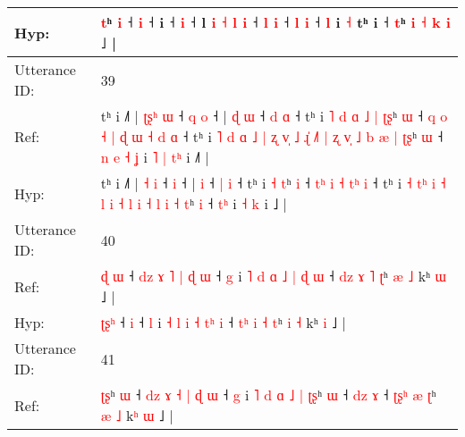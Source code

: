 \documentclass[10pt]{article}
\DeclareRobustCommand{\hl}[1]{{\textcolor{red}{#1}}}
\begin{document}
\begin{longtable}{ll}
 \\
Hyp: & \hl{}\hl{t}ʰ \hl{i} ˧\hl{}\hl{} \hl{i} ˧\hl{}\hl{} i\hl{}\hl{}\hl{}\hl{}\hl{}\hl{}\hl{}\hl{} ˧\hl{}\hl{} \hl{i} ˧\hl{}\hl{}\hl{}\hl{}\hl{}\hl{}\hl{}\hl{}\hl{}\hl{}\hl{}\hl{}\hl{}\hl{}\hl{}\hl{}\hl{} l\hl{}\hl{}\hl{}\hl{} \hl{i} \hl{}\hl{˧} \hl{l} \hl{}\hl{i} ˧\hl{}\hl{} \hl{}\hl{}\hl{l} \hl{i} ˧ \hl{l} \hl{i} ˧ \hl{l} i\hl{}\hl{} \hl{˧} tʰ i ˧ \hl{t}ʰ \hl{i} \hl{˧} \hl{}\hl{k} \hl{i} ˩ |
 \\
\midrule
Utterance ID: & 39 \\
Ref: & tʰ i ˩˥ | \hl{ʈ}\hl{ʂ}\hl{ʰ} \hl{ɯ} ˧\hl{ }\hl{q} \hl{o} ˧ |\hl{ }\hl{ɖ} \hl{ɯ} ˧ \hl{d} \hl{ɑ} ˧ tʰ i\hl{ }\hl{˥}\hl{ }\hl{d}\hl{ }\hl{ɑ}\hl{ }\hl{˩} \hl{|} \hl{ʈ}\hl{ʂ}ʰ \hl{ɯ} ˧\hl{ }\hl{q}\hl{ }\hl{o} \hl{˧}\hl{ }\hl{|} \hl{ɖ} \hl{ɯ} \hl{˧}\hl{ }\hl{d} \hl{ɑ} ˧ tʰ i\hl{ }\hl{˥}\hl{ }\hl{d}\hl{ }\hl{ɑ} \hl{˩} \hl{|}\hl{ }\hl{ʐ} \hl{v}\hl{̩} \hl{˩} \hl{ɻ}\hl{̍} \hl{˩}\hl{˥} \hl{|} \hl{ʐ} \hl{v}\hl{̩} \hl{˩} \hl{b} \hl{æ} \hl{|} \hl{ʈ}\hl{ʂ}ʰ \hl{ɯ} ˧\hl{ }\hl{n}\hl{ }\hl{e} \hl{˧}\hl{ }\hl{ʝ} i\hl{ }\hl{˥} \hl{|} \hl{t}\hl{ʰ} i ˩\hl{˥} |
 \\
Hyp: & tʰ i ˩˥ | \hl{}\hl{}\hl{˧} \hl{i} ˧\hl{}\hl{} \hl{i} ˧ |\hl{}\hl{} \hl{i} ˧ \hl{|} \hl{i} ˧ tʰ i\hl{}\hl{}\hl{}\hl{}\hl{}\hl{}\hl{}\hl{} \hl{˧} \hl{}\hl{t}ʰ \hl{i} ˧\hl{}\hl{}\hl{}\hl{} \hl{}\hl{t}\hl{ʰ} \hl{i} \hl{˧} \hl{}\hl{t}\hl{ʰ} \hl{i} ˧ tʰ i\hl{}\hl{}\hl{}\hl{}\hl{}\hl{} \hl{˧} \hl{}\hl{t}\hl{ʰ} \hl{}\hl{i} \hl{˧} \hl{}\hl{l} \hl{}\hl{i} \hl{˧} \hl{l} \hl{}\hl{i} \hl{˧} \hl{l} \hl{i} \hl{˧} \hl{}\hl{t}ʰ \hl{i} ˧\hl{}\hl{}\hl{}\hl{} \hl{}\hl{t}\hl{ʰ} i\hl{}\hl{} \hl{˧} \hl{}\hl{k} i ˩\hl{} |
 \\
\midrule
Utterance ID: & 40 \\
Ref: & \hl{ɖ}\hl{ }\hl{ɯ} ˧\hl{ }\hl{d}\hl{z}\hl{ }\hl{ɤ}\hl{ }\hl{˥}\hl{ }\hl{|}\hl{ }\hl{ɖ} \hl{ɯ} ˧ \hl{g} i \hl{˥} \hl{d} \hl{ɑ} \hl{˩} \hl{|}\hl{ }\hl{ɖ} \hl{ɯ} ˧ \hl{d}\hl{z} \hl{ɤ} \hl{˥} \hl{ʈ}ʰ \hl{æ} \hl{˩} kʰ \hl{ɯ} ˩ |
 \\
Hyp: & \hl{ʈ}\hl{ʂ}\hl{ʰ} ˧\hl{}\hl{}\hl{}\hl{}\hl{}\hl{}\hl{}\hl{}\hl{}\hl{}\hl{} \hl{i} ˧ \hl{l} i \hl{˧} \hl{l} \hl{i} \hl{˧} \hl{}\hl{t}\hl{ʰ} \hl{i} ˧ \hl{t}\hl{ʰ} \hl{i} \hl{˧} \hl{t}ʰ \hl{i} \hl{˧} kʰ \hl{i} ˩ |
 \\
\midrule
Utterance ID: & 41 \\
Ref: & \hl{ʈ}\hl{ʂ}ʰ \hl{ɯ} ˧ \hl{d}\hl{z} \hl{ɤ} \hl{˧} \hl{|} \hl{ɖ} \hl{ɯ} ˧ \hl{}\hl{g} i \hl{˥} \hl{d}\hl{ }\hl{ɑ} \hl{˩} \hl{|} \hl{ʈ}\hl{ʂ}ʰ \hl{ɯ} ˧ \hl{d}\hl{z} \hl{ɤ} ˧ \hl{}\hl{ʈ}\hl{ʂ}\hl{ʰ} \hl{æ} \hl{ʈ}ʰ \hl{æ} \hl{˩} k\hl{ʰ} \hl{ɯ} ˩ |

\end{longtable}
\end{document}
